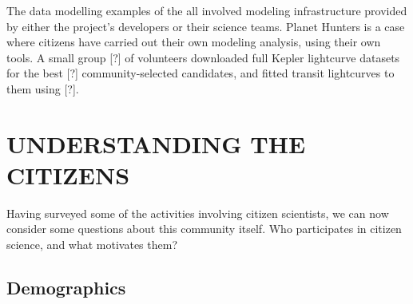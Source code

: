 \documentclass{ar2e}
\begin{document}


  The data modelling
examples of the  all involved modeling infrastructure provided
by either the project's developers or their science teams. Planet Hunters is a
case where citizens have carried out their own modeling analysis, using their
own tools. A small group [?] of volunteers downloaded full Kepler lightcurve
datasets for the best [?] community-selected candidates, and fitted transit
lightcurves to them using [?]. 



% 




\section{UNDERSTANDING THE CITIZENS}
\label{sec:crowd}

Having surveyed some of the activities involving citizen scientists, we can
now consider some questions about this community itself. Who participates in
citizen science, and what motivates them?



\subsection{Demographics}
\label{sec:crowd:demographics}
\end{document}
